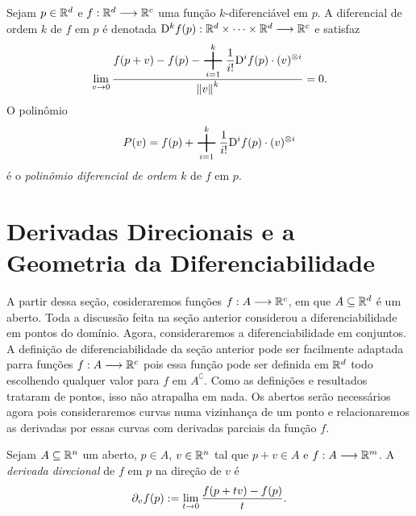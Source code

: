 \begin{nota}
Sejam $p \in \mathbb{R}^d$ e $f: \mathbb{R}^d \longrightarrow \mathbb{R}^c$ uma função $k$-diferenciável em $p$. A diferencial de ordem $k$ de $f$ em $p$ é denotada $\mathrm{D}^k f(p): \mathbb{R}^d \times \cdots \times \mathbb{R}^d \longrightarrow \mathbb{R}^c$ e satisfaz
	\begin{equation*}
	\lim_{v \conv 0} \frac{\displaystyle f(p+v) - f(p) - \bigplus_{i=1}^k \frac{1}{i!}\D^i f(p) \cdot (v)^{\otimes i}}{\nor{v}^k} = 0.
	\end{equation*}
O polinômio
	\begin{equation*}
	P(v) = f(p) + \bigplus_{i=1}^k \frac{1}{i!}\D^i f(p) \cdot (v)^{\otimes i}
	\end{equation*}
é o \emph{polinômio diferencial de ordem $k$} de $f$ em $p$.
\end{nota}

\section{Derivadas Direcionais e a Geometria da Diferenciabilidade}

A partir dessa seção, cosideraremos funções $f: A \longrightarrow \mathbb{R}^c$, em que $A \subseteq \mathbb{R}^d$ é um aberto. Toda a discussão feita na seção anterior considerou a diferenciabilidade em pontos do domínio. Agora, consideraremos a diferenciabilidade em conjuntos. A definição de diferenciabilidade da seção anterior pode ser facilmente adaptada parra funções $f: A \longrightarrow \mathbb{R}^c$ pois essa função pode ser definida em $\mathbb{R}^d$ todo escolhendo qualquer valor para $f$ em $A^\complement$. Como as definições e resultados trataram de pontos, isso não atrapalha em nada. Os abertos serão necessários agora pois consideraremos curvas numa vizinhança de um ponto e relacionaremos as derivadas por essas curvas com derivadas parciais da função $f$.

\begin{defi}
Sejam $A \subseteq \mathbb{R}^n$ um aberto, $p \in A$, $v \in \mathbb{R}^n$ tal que $p+v \in A$ e $f: A \longrightarrow \mathbb{R}^m$. A \emph{derivada direcional} de $f$ em $p$ na direção de $v$ é
	\begin{equation*}
	\partial_v f(p) := \lim_{t \rightarrow 0} \frac{f(p+tv)-f(p)}{t}.
	\end{equation*}
\end{defi}

